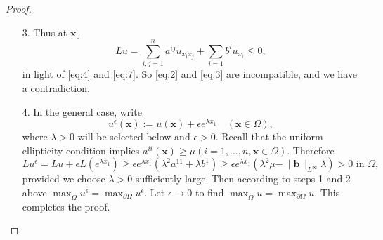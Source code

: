 \begin{sol}
\begin{proof}
\begin{itemize}
    \item[3.]
      Thus at $\mathbf{x}_0$
      \begin{displaymath}
        Lu = \sum_{i,j=1}^na^{ij}u_{x_ix_j} + \sum_{i=1}b^iu_{x_i} \le 0,
      \end{displaymath}
      in light of \eqref{eq:4} and \eqref{eq:7}.
      So \eqref{eq:2} and \eqref{eq:3} are incompatible,
      and we have a contradiction.

    \item[4.]
      In the general case,
      write
      \begin{displaymath}
        u^{\epsilon}(\mathbf{x}) := u(\mathbf{x}) + \epsilon e^{\lambda x_1}
        \quad (\mathbf{x}\in\Omega),
      \end{displaymath}
      where $\lambda>0$ will be selected below and $\epsilon>0$.
      Recall that the uniform ellipticity condition implies
      $a^{ii}(\mathbf{x})\ge \mu (i=1, \ldots, n, \mathbf{x}\in\Omega)$.
      Therefore
      \begin{displaymath}
        Lu^{\epsilon} = Lu + \epsilon L(e^{\lambda x_1})
        \ge \epsilon e^{\lambda x_1}(\lambda^2a^{11}+\lambda b^1)
        \ge \epsilon e^{\lambda x_1}(\lambda^2\mu - \|\mathbf{b}\|_{L^{\infty}}\lambda) > 0 \text{ in }\Omega,
      \end{displaymath}
      provided we choose $\lambda>0$ sufficiently large.
      Then according to steps 1 and 2 above
      $\max_{\overline{\Omega}}u^{\epsilon} = \max_{\partial\Omega}u^{\epsilon}$.
      Let $\epsilon\to 0$ to find
      $\max_{\overline{\Omega}}u = \max_{\partial\Omega} u$.
      This completes the proof.
    \end{itemize}
  \end{proof}
\end{sol}
